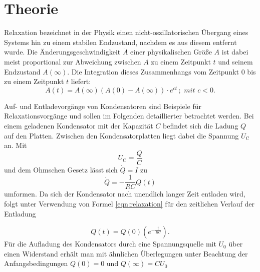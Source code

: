 \section{Theorie}
\label{sec:Theorie}
Relaxation bezeichnet in der Physik einen nicht-oszillatorischen Übergang eines Systems hin zu einem stabilen Endzustand, nachdem es aus diesem entfernt wurde.
Die Änderungsgeschwindigkeit $\dot{A}$ einer physikalischen Größe $A$ ist dabei meist proportional zur Abweichung zwischen $A$ zu einem Zeitpunkt $t$ und seinem Endzustand $A(\infty)$.
Die Integration dieses Zusammenhangs vom Zeitpunkt $0$ bis zu einem Zeitpunkt $t$ liefert:
\begin{equation}
	\label{eqn:relaxation}
	A(t)=A(\infty) (  A(0)-A(\infty) ) \cdot e^{ct}\, ;\,\, mit\,\, c<0 .
\end{equation}

Auf- und Entladevorgänge von Kondensatoren sind Beispiele für Relaxationsvorgänge und sollen im Folgenden detaillierter betrachtet werden.
Bei einem geladenen Kondensator mit der Kapazität $C$ befindet sich die Ladung $Q$ auf den Platten.
Zwischen den Kondensatorplatten liegt dabei die Spannung $U_\text{C}$ an. Mit
\begin{equation*}
	U_\text{C}=\frac{Q}{C}
\end{equation*}
und dem Ohmschen Gesetz lässt sich $\dot{Q}=I$ zu
\begin{equation}
	\dot{Q}=-\frac{1}{RC}Q(t)
\end{equation}
umformen.
Da sich der Kondensator nach unendlich langer Zeit entladen wird, folgt unter Verwendung von Formel \eqref{eqn:relaxation} für den zeitlichen Verlauf der Entladung

\begin{equation}
	\label{eqn:aufladung}
	Q(t)=Q(0)(e^{-\frac{t}{RC}}) \text{.}
\end{equation}
Für die Aufladung des Kondensators durch eine Spannungsquelle mit $U_0$ über einen Widerstand erhält man mit ähnlichen Überlegungen unter Beachtung der Anfangsbedingungen $Q(0)=0$ und $Q(\infty)=CU_\text{0}$

